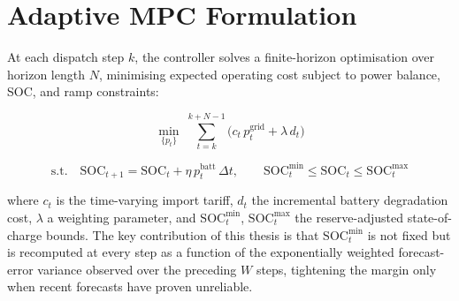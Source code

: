 \section{Adaptive MPC Formulation}

At each dispatch step $k$, the controller solves a finite-horizon optimisation over horizon length $N$, minimising expected operating cost subject to power balance, SOC, and ramp constraints:

\begin{equation}
\min_{\{p_t\}} \; \sum_{t=k}^{k+N-1} \Big( c_t\, p^{\text{grid}}_t + \lambda\, d_t \Big)
\label{eq:objective}
\end{equation}

\begin{equation}
\text{s.t.} \quad \mathrm{SOC}_{t+1} = \mathrm{SOC}_t + \eta\, p^{\text{batt}}_t \,\Delta t, \qquad
\mathrm{SOC}^{\min}_t \le \mathrm{SOC}_t \le \mathrm{SOC}^{\max}_t
\label{eq:soc}
\end{equation}

where $c_t$ is the time-varying import tariff, $d_t$ the incremental battery degradation cost, $\lambda$ a weighting parameter, and $\mathrm{SOC}^{\min}_t$, $\mathrm{SOC}^{\max}_t$ the reserve-adjusted state-of-charge bounds. The key contribution of this thesis is that $\mathrm{SOC}^{\min}_t$ is not fixed but is recomputed at every step as a function of the exponentially weighted forecast-error variance observed over the preceding $W$ steps, tightening the margin only when recent forecasts have proven unreliable.
